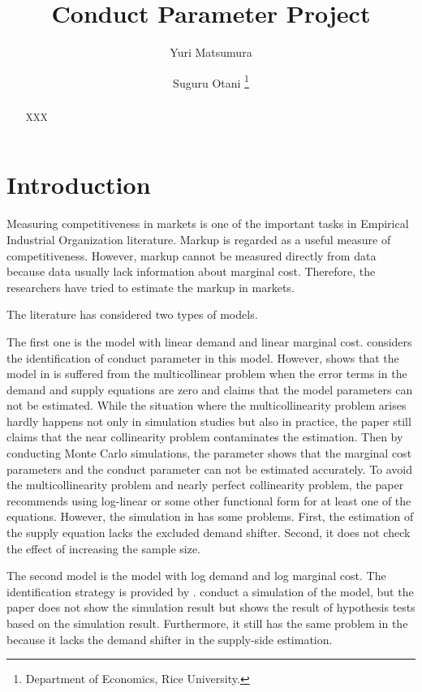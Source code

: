\documentclass[11pt, a4paper]{article}
\title{Conduct Parameter Project}
\author{Yuri Matsumura \and Suguru Otani \footnote{Department of Economics, Rice University.}}
\begin{document}
\maketitle

\begin{abstract}
    XXX
\end{abstract}

\section{Introduction}
Measuring competitiveness in markets is one of the important tasks in Empirical Industrial Organization literature.
Markup is regarded as a useful measure of competitiveness. 
However, markup cannot be measured directly from data because data usually lack information about marginal cost.
Therefore, the researchers have tried to estimate the markup in markets.



The literature has considered two types of models.

The first one is the model with linear demand and linear marginal cost.
\citet{bresnahan1982oligopoly} considers the identification of conduct parameter in this model.
However, \citet{perloff2012collinearity} shows that the model in \citet{bresnahan1982oligopoly} is suffered from the multicollinear problem when the error terms in the demand and supply equations are zero and claims that the model parameters can not be estimated.
While the situation where the multicollinearity problem arises hardly happens not only in simulation studies but also in practice, the paper still claims that the near collinearity problem contaminates the estimation.
Then by conducting Monte Carlo simulations, the parameter shows that the marginal cost parameters and the conduct parameter can not be estimated accurately.
To avoid the multicollinearity problem and nearly perfect collinearity problem, the paper recommends using log-linear or some other functional form for at least one of the equations.
However, the simulation in \cite{perloff2012collinearity} has some problems.
First, the estimation of the supply equation lacks the excluded demand shifter.
Second, it does not check the effect of increasing the sample size.


The second model is the model with log demand and log marginal cost.
The identification strategy is provided by \citet{lau1982identifying}.
\cite{hyde1995can} conduct a simulation of the model, but the paper does not show the simulation result but shows the result of hypothesis tests based on the simulation result.
Furthermore, it still has the same problem in the \cite{perloff2012collinearity} because it lacks the demand shifter in the supply-side estimation.
\end{document}
